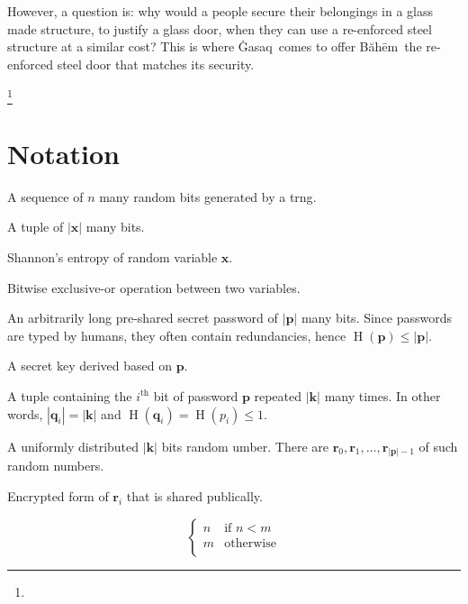 \documentclass[twocolumn,hidelinks]{article}
\newcommand{\ghasaq}{Ġasaq}
\newcommand{\baheem}{Băhēm}
\DeclareMathOperator{\random}{random}
\DeclareMathOperator{\entropy}{H}
\newcommand\blfootnote[1]{%
  \begingroup
  \renewcommand\thefootnote{}\footnote{#1}%
  \addtocounter{footnote}{-1}%
  \endgroup
}
\begin{document}
However, a question is:  why would a people secure their belongings in a
glass made structure, to justify a glass door, when they can use a
re-enforced steel structure at a similar cost?  This is where \ghasaq\
comes to offer \baheem\ the re-enforced steel door that matches its
security.

\blfootnote{\vspace{-1em}\doclicenseThis}
\vfill
\break

\section*{Notation}
\begin{description}[itemsep=0em]
    \item[$\random(n) = (r_0, r_1, \ldots, r_n)$:]  A sequence of $n$ many
        random bits generated by a \gls{trng}.
    \item[$\mathbf{x} = (x_0, x_1, \ldots, x_{|\mathbf{x}|-1})$:]  A tuple
        of $|\mathbf{x}|$ many bits.
    \item[$\entropy(\mathbf{x})$:]  Shannon's entropy of random variable
        $\mathbf{x}$.
    \item[$\mathbf{x} \oplus \mathbf{y}$:]  Bitwise exclusive-or operation
        between two variables.
    \item[$\mathbf{p} = (p_0, p_1, \ldots, p_{|\mathbf{p}|-1})$:]  An
        arbitrarily long pre-shared secret password of $|\mathbf{p}|$ many
        bits.  Since passwords are typed by humans, they often contain
        redundancies, hence $\entropy(\mathbf{p}) \le |\mathbf{p}|$.
    \item[$\mathbf{k} = (k_0, k_1, \ldots, k_{|\mathbf{k}|-1})$:]  A
        secret key derived based on $\mathbf{p}$.
    \item[$\mathbf{q}_i = (p_i, p_i, \ldots)$:]  A tuple containing the
        $i^{\text{th}}$ bit of password $\mathbf{p}$ repeated
        $|\mathbf{k}|$ many times.  In other words,
        $|\mathbf{q}_i|=|\mathbf{k}|$ and $\entropy(\mathbf{q}_i) =
        \entropy(p_i) \le 1$.
    \item[$\mathbf{r}_i = \random(|\mathbf{k}|)$:]  A uniformly distributed
        $|\mathbf{k}|$ bits random umber.  There are $\mathbf{r}_0,
        \mathbf{r}_1, \ldots, \mathbf{r}_{|\mathbf{p}| - 1}$ of such random
        numbers.
    \item[$\mathbf{\hat r}_i$:]  Encrypted form of $\mathbf{r}_i$ that is
        shared publically.
    \item[$\min(n, m)$:]
        \[\begin{cases}
            n & \text{if } n < m\\
            m & \text{otherwise}\\
        \end{cases}\]
\end{description}
\end{document}
